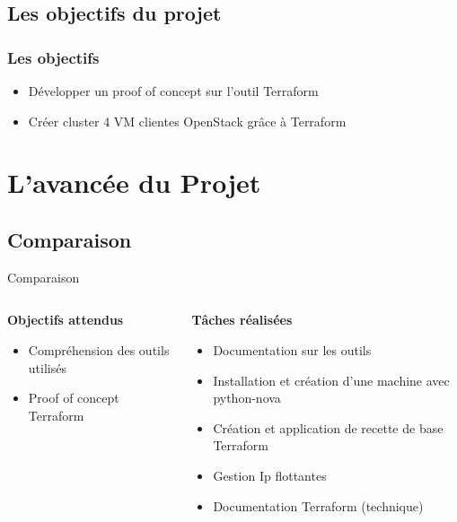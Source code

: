 \documentclass[11pt]{beamer} %
\begin{document}
		\subsection{Les objectifs du projet}
			\begin{frame}
				\frametitle{Les objectifs}
				\begin{itemize}
					\item Développer un proof of concept sur l'outil Terraform
					\item Créer cluster 4 VM clientes OpenStack grâce à Terraform
				\end{itemize}
			\end{frame}
		
	\section{L'avancée du Projet}
	
	\subsection{Comparaison}
		
		\begin{frame}{Comparaison}

		\begin{columns}[c]
            \begin{column}{5cm}
         
          {\small \textbf{ Objectifs attendus}}
                \begin{itemize}
                \item {\small Compréhension des outils utilisés}                                                    
                \item {\small Proof of concept Terraform}
               \end{itemize}
            \end{column}
            \begin{column}{5cm}
          {\small   \textbf{ Tâches réalisées}}
            \begin{itemize}
            
            \item  {\small Documentation sur les outils }
            \item  {\small Installation et création d'une machine avec python-nova}
            \item  {\small Création et application de recette de base Terraform }
            \item  {\small  Gestion Ip flottantes }
            \item  {\small Documentation Terraform (technique) }
            \end{itemize}
               
                \end{column}
          \end{columns}
\end{frame}
\end{document}
